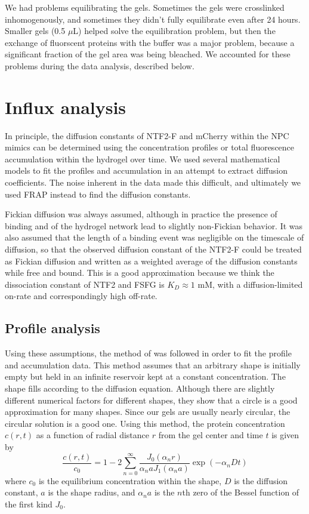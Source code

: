 We had problems equilibrating the gels.  Sometimes the gels were crosslinked inhomogenously, and sometimes they didn't fully equilibrate even after 24 hours.  Smaller gels (0.5 $\mu$L) helped solve the equilibration problem, but then the exchange of fluorscent proteins with the buffer was a major problem, because a significant fraction of the gel area was being bleached.  We accounted for these problems during the data analysis, described below.

\section{Influx analysis}
In principle, the diffusion constants of NTF2-F and mCherry within the NPC mimics can be determined using the concentration profiles or total fluorescence accumulation within the hydrogel over time.  We used several mathematical models to fit the profiles and accumulation in an attempt to extract diffusion coefficients.  The noise inherent in the data made this difficult, and ultimately we used FRAP instead to find the diffusion constants.

Fickian diffusion was always assumed, although in practice the presence of binding and of the hydrogel network lead to slightly non-Fickian behavior.  It was also assumed that the length of a binding event was negligible on the timescale of diffusion, so that the observed diffusion constant of the NTF2-F could be treated as Fickian diffusion and written as a weighted average of the diffusion constants while free and bound.  This is a good approximation because we think the dissociation constant of NTF2 and FSFG is $K_D \approx 1$ mM, with a diffusion-limited on-rate and correspondingly high off-rate.
\subsection{Profile analysis}
\label{sec:profile-analysis}
Using these assumptions, the method of \cite{mortensen06} was followed in order to fit the profile and accumulation data.  This method assumes that an arbitrary shape is initially empty but held in an infinite reservoir kept at a constant concentration.  The shape fills according to the diffusion equation.  Although there are slightly different numerical factors for different shapes, they show that a circle is a good approximation for many shapes.  Since our gels are usually nearly circular, the circular solution is a good one.  Using this method, the protein concentration $c(r,t)$ as a function of radial distance $r$ from the gel center and time $t$ is given by
\begin{equation}
\frac{c(r,t)}{c_0} = 1 - 2\sum_{n=0}^\infty \frac{J_0(\alpha_n r)}{\alpha_n a J_1(\alpha_n a)}\exp(-\alpha_n D t)
\label{eq:full-profile}
\end{equation}
where $c_0$ is the equilibrium concentration within the shape, $D$ is the diffusion constant, $a$ is the shape radius, and $\alpha_n a$ is the $n$th zero of the Bessel function of the first kind $J_0$.

